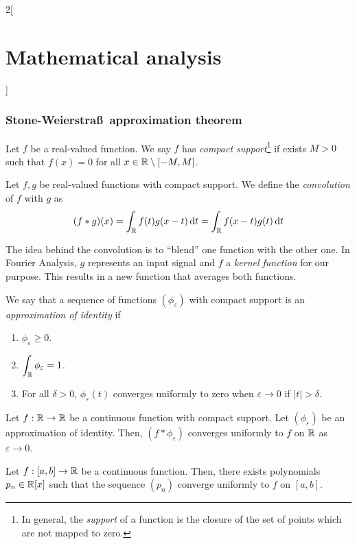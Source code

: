 \documentclass[../../../main_math.tex]{subfiles}
\begin{document}
\begin{multicols}{2}[\section{Mathematical analysis}]
  \subsubsection{Stone-Weierstra\ss\  approximation theorem}
  \begin{definition}
    Let $f$ be a real-valued function. We say $f$ has \emph{compact support}\footnote{In general, the \emph{support} of a function is the closure of the set of points which are not mapped to zero.} if exists $M>0$ such that $f(x)=0$ for all $x\in\mathbb{R} \setminus[-M,M]$.
  \end{definition}
  \begin{definition}
    Let $f,g$ be real-valued functions with compact support. We define the \emph{convolution} of $f$ with $g$ as $$(f*g)(x)=\int_{\mathbb{R}} f(t)g(x-t)\dd{t}=\int_{\mathbb{R}}f(x-t)g(t)\dd{t}$$
  \end{definition}
  \begin{remark}
    The idea behind the convolution is to ``blend'' one function with the other one. In Fourier Analysis, $g$ represents an input signal and $f$ a \emph{kernel function} for our purpose. This results in a new function that averages both functions.
  \end{remark}
  \begin{definition}
    We say that a sequence of functions $(\phi_\varepsilon)$ with compact support is an \emph{approximation of identity} if
    \begin{enumerate}
      \item $\phi_\varepsilon\geq 0$.
      \item $\displaystyle\int_{\mathbb{R}} \phi_\varepsilon=1$.
      \item For all $\delta>0$, $\phi_\varepsilon(t)$ converges uniformly to zero when $\varepsilon\rightarrow 0$ if $|t|>\delta$.
    \end{enumerate}
  \end{definition}
  \begin{lemma}
    Let $f:\mathbb{R} \rightarrow\mathbb{R} $ be a continuous function with compact support. Let $(\phi_\varepsilon)$ be an approximation of identity. Then, $(f*\phi_\varepsilon)$ converges uniformly to $f$ on $\mathbb{R} $ as $\varepsilon\rightarrow 0$.
  \end{lemma}
  \begin{theorem}\label{MA:weierstrasspolynomials}
    Let $f:[a,b]\rightarrow\mathbb{R} $ be a continuous function. Then, there exists polynomials $p_n\in\mathbb{R} [x]$ such that the sequence $(p_n)$ converge uniformly to $f$ on $[a,b]$.
  \end{theorem}

\end{multicols}
\end{document}
